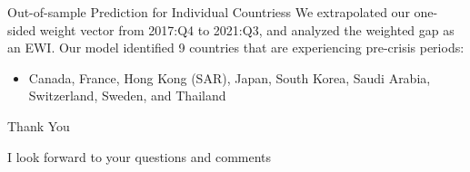 \documentclass[
  ignorenonframetext,
]{beamer}
\providecommand{\tightlist}{%
  \setlength{\itemsep}{0pt}\setlength{\parskip}{0pt}}
\begin{document}
\begin{frame}{Out-of-sample Prediction for Individual Countriess}
\protect\hypertarget{out-of-sample-prediction-for-individual-countriess}{}
We extrapolated our one-sided weight vector from 2017:Q4 to 2021:Q3, and
analyzed the weighted gap as an EWI. Our model identified 9 countries
that are experiencing pre-crisis periods:

\begin{itemize}
\tightlist
\item
  Canada, France, Hong Kong (SAR), Japan, South Korea, Saudi Arabia,
  Switzerland, Sweden, and Thailand
\end{itemize}
\end{frame}

\begin{frame}{Thank You}
\protect\hypertarget{thank-you}{}
\begin{block}{I look forward to your questions and comments}
\protect\hypertarget{i-look-forward-to-your-questions-and-comments}{}
\end{block}
\end{frame}
\end{document}
